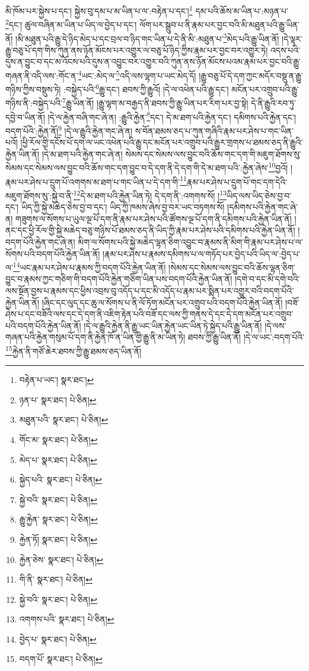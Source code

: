 མི་ཁོམ་པར་སྐྱེས་པ་དང་། སྐྱེས་བུ་དམ་པ་མ་ཡིན་པ་ལ་:བརྟེན་པ་དང་།\footnote{བརྟེན་པ་ཡང་།  སྣར་ཐང་། } དམ་པའི་ཆོས་མ་ཡིན་པ་:མཉན་པ་\footnote{ཉན་པ་  སྣར་ཐང་།  པེ་ཅིན། }དང་། ཚུལ་བཞིན་མ་ཡིན་པ་ཡིད་ལ་བྱེད་པ་དང་། ལོག་པར་སྒྲུབ་པ་ནི་རྣམ་པར་བྱང་བའི་མི་མཐུན་པའི་རྒྱུ་ཡིན་ནོ། །མི་མཐུན་པའི་རྒྱུ་དེ་ཉིད་མེད་པ་དང་བྲལ་བ་ཉིད་གང་ཡིན་པ་དེ་ནི་མི་:མཐུན་པ་\footnote{མཐུན་པའི་  སྣར་ཐང་།  པེ་ཅིན། }མེད་པའི་རྒྱུ་ཡིན་ནོ། །དེ་ལྟར་རྒྱུ་བཅུ་པོ་དག་གིས་ཀུན་ནས་ཉོན་མོངས་པར་འགྱུར་ལ་བཅུ་པོ་ཉིད་ཀྱིས་རྣམ་པར་བྱང་བར་འགྱུར་ཏེ། འདས་པའི་དུས་ན་བྱུང་བ་དང་མ་འོངས་པའི་དུས་ན་འབྱུང་བར་འགྱུར་བའི་ཀུན་ནས་ཉོན་མོངས་པའམ་རྣམ་པར་བྱང་བའི་རྒྱུ་གཞན་ནི་འདི་ལས་:གོང་ན་\footnote{གོང་མ་  སྣར་ཐང་།  པེ་ཅིན། }ཡང་:མེད་ལ་\footnote{མེད་པ་  སྣར་ཐང་།  པེ་ཅིན། }འདི་ལས་ལྷག་པ་ཡང་མེད་དོ། །རྒྱུ་བཅུ་པོ་དེ་དག་ཀྱང་མདོར་བསྡུ་ན་རྒྱུ་གཉིས་ཀྱིས་བསྡུས་ཏེ། :བསྐྱེད་པའི་\footnote{སྐྱེད་པའི་  སྣར་ཐང་།  པེ་ཅིན། }རྒྱུ་དང་། ཐབས་ཀྱི་རྒྱུའོ། །དེ་ལ་འཕེན་པའི་རྒྱུ་དང་། མངོན་པར་འགྲུབ་པའི་རྒྱུ་གཉིས་ནི་:བསྐྱེད་པའི་\footnote{སྐྱེ་བའི་  སྣར་ཐང་།  པེ་ཅིན། }རྒྱུ་ཡིན་ནོ། །རྒྱུ་ལྷག་མ་བརྒྱད་ནི་ཐབས་ཀྱི་རྒྱུ་ཡིན་པར་རིག་པར་བྱ་སྟེ། དེ་ནི་རྒྱུའི་རབ་ཏུ་དབྱེ་བ་ཡིན་ནོ། །དེ་ལ་རྐྱེན་བཞི་གང་ཞེ་ན། :རྒྱུའི་རྐྱེན་\footnote{རྒྱུ་རྐྱེན་  སྣར་ཐང་།  པེ་ཅིན། }དང་། དེ་མ་ཐག་པའི་རྐྱེན་དང་། དམིགས་པའི་རྐྱེན་དང་། བདག་པོའི་:རྐྱེན་ནོ།\footnote{རྐྱེན་ཏོ།  སྣར་ཐང་།  པེ་ཅིན། } །དེ་ལ་རྒྱུའི་རྐྱེན་གང་ཞེ་ན། ས་བོན་ཐམས་ཅད་པ་ཀུན་གཞིའི་རྣམ་པར་ཤེས་པ་གང་ཡིན་པའོ། །ཕྱི་རོལ་གྱི་དངོས་པོ་དག་ལ་ཡང་འཕེན་པའི་རྒྱུ་དང་མངོན་པར་འགྲུབ་པའི་རྒྱུར་གྲགས་པ་ཐམས་ཅད་ནི་རྒྱུའི་རྐྱེན་ཡིན་ནོ། །དེ་མ་ཐག་པའི་རྐྱེན་གང་ཞེ་ན། སེམས་དང་སེམས་ལས་བྱུང་བའི་ཆོས་གང་དག་གི་མཇུག་ཐོགས་སུ་སེམས་དང་སེམས་ལས་བྱུང་བའི་ཆོས་གང་དག་བྱུང་བ་དེ་དག་ནི་དེ་དག་གི་དེ་མ་ཐག་པའི་:རྐྱེན་ཞེས་\footnote{རྐྱེན་ཅེས་  སྣར་ཐང་།  པེ་ཅིན། }བྱའོ། །རྣམ་པར་ཤེས་པ་དྲུག་པོ་འགགས་མ་ཐག་པ་གང་ཡིན་པ་དེ་དག་གི་\footnote{གི་ནི་  སྣར་ཐང་།  པེ་ཅིན། }རྣམ་པར་ཤེས་པ་དྲུག་པོ་གང་དག་དེའི་མཇུག་ཐོགས་སུ་:སྐྱེ་བ་ནི་\footnote{སྐྱེ་བའི་  སྣར་ཐང་།  པེ་ཅིན། }དེ་མ་ཐག་པའི་རྐྱེན་ཡིན་ཏེ། དེ་དག་ནི་:འགགས་སོ། །\footnote{འགགས་པའི་  སྣར་ཐང་།  པེ་ཅིན། }ཡིད་ལས་ཡིད་ཅེས་བྱ་བ་དང་། ཡིད་ཀྱི་སྐྱེ་མཆེད་ཅེས་བྱ་བ་དང་། ཡིད་ཀྱི་ཁམས་ཞེས་བྱ་བར་ཡང་བཏགས་སོ། །དམིགས་པའི་རྐྱེན་གང་ཞེ་ན། གཟུགས་ལ་སོགས་པ་ཡུལ་ལྔ་པོ་དག་ནི་རྣམ་པར་ཤེས་པའི་ཚོགས་ལྔ་པོ་དག་ནི་དམིགས་པའི་རྐྱེན་ཡིན་ནོ། །ནང་དང་ཕྱི་རོལ་གྱི་སྐྱེ་མཆེད་བཅུ་གཉིས་པོ་ཐམས་ཅད་ནི་ཡིད་ཀྱི་རྣམ་པར་ཤེས་པའི་དམིགས་པའི་རྐྱེན་ཡིན་ནོ། །བདག་པོའི་རྐྱེན་གང་ཞེ་ན། མིག་ལ་སོགས་པའི་སྐྱེ་མཆེད་ལྷན་ཅིག་འབྱུང་བ་རྣམས་ནི་མིག་གི་རྣམ་པར་ཤེས་པ་ལ་སོགས་པའི་བདག་པོའི་རྐྱེན་ཡིན་ནོ། །རྣམ་པར་ཤེས་པ་རྣམས་དམིགས་པ་ལ་གཏོད་པར་བྱེད་པའི་ཡིད་ལ་:བྱེད་པ་ལ་\footnote{བྱེད་པ་  སྣར་ཐང་།  པེ་ཅིན། }ཡང་རྣམ་པར་ཤེས་པ་རྣམས་ཀྱི་བདག་པོའི་རྐྱེན་ཡིན་ནོ། །སེམས་དང་སེམས་ལས་བྱུང་བའི་ཆོས་ལྷན་ཅིག་བྱུང་བ་རྣམས་ཀྱང་གཅིག་གི་བདག་པོའི་རྐྱེན་གཅིག་ཡིན་པས་བདག་པོའི་རྐྱེན་ཡིན་ནོ། །དགེ་བ་དང་མི་དགེ་བའི་ལས་སྔོན་བྱས་པ་རྣམས་དང་ཕྱིས་འབྲས་བུ་འདོད་པ་དང་མི་འདོད་པ་རྣམ་པར་སྨིན་པར་འགྱུར་བའི་བདག་པོའི་རྐྱེན་ཡིན་ནོ། །ཞིང་དང་ལུད་དང་ཆུ་ལ་སོགས་པ་ནི་ལོ་ཏོག་མངོན་པར་འགྲུབ་པའི་བདག་པོའི་རྐྱེན་ཡིན་ནོ། །བཟོ་ཤེས་པ་དང་བཟོའི་ལས་དང་དེ་དག་ནི་འཇིག་རྟེན་པའི་བཟོ་དང་ལས་ཀྱི་གནས་དེ་དང་དེ་དག་མངོན་པར་འགྲུབ་པའི་བདག་པོའི་རྐྱེན་ཡིན་ནོ། །དེ་ལ་རྒྱུའི་རྐྱེན་ནི་རྒྱུ་ཡང་ཡིན་རྐྱེན་ཡང་ཡིན་ཏེ་སྐྱེད་པའི་རྒྱུ་ཡིན་ནོ། །དེ་ལས་གཞན་པའི་རྐྱེན་གསུམ་པོ་དག་ནི་རྐྱེན་ཁོ་ན་ཡིན་གྱི་རྒྱུ་ནི་མ་ཡིན་ཏེ། ཐབས་ཀྱི་རྒྱུ་ཡིན་ནོ། །དེ་ལ་ཡང་:བདག་པོའི་\footnote{བདག་པོ་  སྣར་ཐང་།  པེ་ཅིན། }རྐྱེན་ནི་གཙོ་ཆེར་ཐབས་ཀྱི་རྒྱུ་ཐམས་ཅད་ཡིན་ནོ། 
